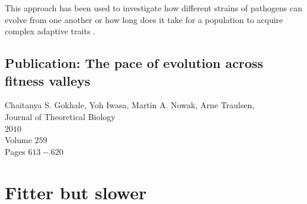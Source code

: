 \documentclass[oneside,11pt,a4paper]{book}
\begin{document}
This approach has been used to investigate how different strains of pathogens can evolve from one another \citep{alexander:2010td} or how long does it take for a population to acquire complex adaptive traits \citep{lynch:2010aa,lynch:2010ab}.

\subsection{Publication: The pace of evolution across fitness valleys}

Chaitanya S. Gokhale, Yoh Iwasa, Martin A. Nowak, Arne Traulsen,\\
Journal of Theoretical Biology\\
$2010$\\
Volume $259$\\
Pages $613-620$



\section{Fitter but slower}
\label{sec:stoslo}
\graphicspath{{Figs_Stoslo/}{Figs_Stoslo/}{Figs_Stoslo/}}
\end{document}

